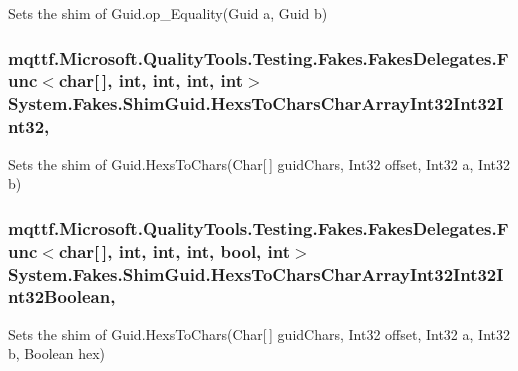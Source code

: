 Sets the shim of Guid.\-op\-\_\-\-Equality(\-Guid a, Guid b)

\hypertarget{class_system_1_1_fakes_1_1_shim_guid_ab52415df38c58c48e9ed5665118c7ce7}{
\subsubsection[{Hexs\-To\-Chars\-Char\-Array\-Int32\-Int32\-Int32}]{\setlength{\rightskip}{0pt plus 5cm}mqttf.\-Microsoft.\-Quality\-Tools.\-Testing.\-Fakes.\-Fakes\-Delegates.\-Func$<$char\mbox{[}$\,$\mbox{]}, int, int, int, int$>$ System.\-Fakes.\-Shim\-Guid.\-Hexs\-To\-Chars\-Char\-Array\-Int32\-Int32\-Int32\hspace{0.3cm}{\ttfamily [static]}, {\ttfamily [set]}}}\label{class_system_1_1_fakes_1_1_shim_guid_ab52415df38c58c48e9ed5665118c7ce7}


Sets the shim of Guid.\-Hexs\-To\-Chars(\-Char\mbox{[}$\,$\mbox{]} guid\-Chars, Int32 offset, Int32 a, Int32 b)

\hypertarget{class_system_1_1_fakes_1_1_shim_guid_ad0f7bb711e5a5908732864995f8f4cec}{
\subsubsection[{Hexs\-To\-Chars\-Char\-Array\-Int32\-Int32\-Int32\-Boolean}]{\setlength{\rightskip}{0pt plus 5cm}mqttf.\-Microsoft.\-Quality\-Tools.\-Testing.\-Fakes.\-Fakes\-Delegates.\-Func$<$char\mbox{[}$\,$\mbox{]}, int, int, int, bool, int$>$ System.\-Fakes.\-Shim\-Guid.\-Hexs\-To\-Chars\-Char\-Array\-Int32\-Int32\-Int32\-Boolean\hspace{0.3cm}{\ttfamily [static]}, {\ttfamily [set]}}}\label{class_system_1_1_fakes_1_1_shim_guid_ad0f7bb711e5a5908732864995f8f4cec}


Sets the shim of Guid.\-Hexs\-To\-Chars(\-Char\mbox{[}$\,$\mbox{]} guid\-Chars, Int32 offset, Int32 a, Int32 b, Boolean hex)

